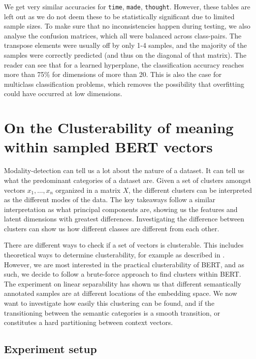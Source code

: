 \documentclass[a4paper,12pt,oneside,openright]{report}
\begin{document}
\hfill \break

We get very similar accuracies for \Verb#time#, \Verb#made#, \Verb#thought#.
However, these tables are left out as we do not deem these to be statistically significant due to limited sample sizes.
To make sure that no inconsistencies happen during testing, we also analyse the confusion matrices, which all were balanced across class-pairs.
The transpose elements were usually off by only 1-4 samples, and the majority of the samples were correctly predicted (and thus on the diagonal of that matrix).
The reader can see that for a learned hyperplane, the classification accuracy reaches more than 75\% for dimensions of more than 20.
This is also the case for multiclass classification problems, which removes the possibility that overfitting could have occurred at low dimensions.

\section{On the Clusterability of meaning within sampled BERT vectors} \label{experiment_BERT_clusterability}

Modality-detection can tell us a lot about the nature of a dataset.
It can tell us what the predominant categories of a dataset are.
Given a set of clusters amongst vectors $x_1, \ldots, x_n$ organized in a matrix $X$, the different clusters can be interpreted as the different modes of the data.
The key takeaways follow a similar interpretation as what principal components are, showing us the features and latent dimensions with greatest differences.
Investigating the difference between clusters can show us how different classes are different from each other.

There are different ways to check if a set of vectors is clusterable. This includes theoretical ways to determine clusterability, for example as described in \cite{ackerman09, mccarthy16}. 
However, we are most interested in the practical clusterability of BERT, and as such, we decide to follow a brute-force approach to find clusters within BERT. The experiment on linear separability has shown us that different semantically annotated samples are at different locations of the embedding space.
We now want to investigate how easily this clustering can be found, and if the transitioning between the semantic categories is a smooth transition, or constitutes a hard partitioning between context vectors.

\subsection{Experiment setup}
\end{document}
